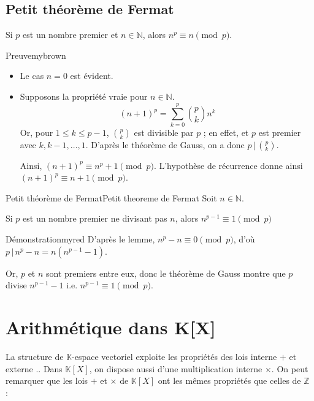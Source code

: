 \subsection{Petit théorème de Fermat}

    \begin{lem}{}{}
        Si $p$ est un nombre premier et $n \in \mathbb{N}$, alors $n^p \equiv n \pmod p$.
    \end{lem}

    \begin{demo}{Preuve}{mybrown}
        \begin{itemize}
            \item Le cas $n = 0$ est évident.
            \item Supposons la propriété vraie pour $n \in \mathbb{N}$.
            \[ (n+1)^p = \sum\limits_{k=0}^p \binom{p}{k} n^k \] 
            Or, pour $1 \leq k \leq p-1$, $\binom{p}{k}$ est divisible par $p$ ; en effet,  et $p$ est premier avec $k, k-1, \ldots, 1$. D’après le théorème de Gauss, on a donc $p \, | \, \binom{p}{k}$.
            
            Ainsi, $(n+1)^p \equiv n^p + 1 \pmod p$. L’hypothèse de récurrence donne ainsi $(n+1)^p \equiv n + 1 \pmod p$.
        \end{itemize}
    \end{demo}

    \begin{theo}{Petit théorème de Fermat}{Petit theoreme de Fermat}
        Soit $n \in \mathbb{N}$.
        
        Si $p$ est un nombre premier ne divisant pas $n$, alors $n^{p-1} \equiv 1 \pmod p$
    \end{theo}

    \begin{demo}{Démonstration}{myred}
        D’après le lemme, $n^p - n \equiv 0 \pmod p$, d’où $p \, | \, n^p - n = n(n^{p-1} - 1)$. 

        Or, $p$ et $n$ sont premiers entre eux, donc le théorème de Gauss montre que $p$ divise $n^{p-1} - 1$ i.e. $ n^{p-1} \equiv 1 \pmod p$.
    \end{demo}

\section{Arithmétique dans K[X]}

    La structure de $\mathbb{K}$-espace vectoriel exploite les propriétés des lois interne $+$ et externe $.$. Dans $\mathbb{K}[X]$, on dispose aussi d’une multiplication interne $\times$. On peut remarquer que les lois $+$ et $\times$ de $\mathbb{K}[X]$ ont les mêmes propriétés que celles de $\mathbb{Z}$ :

